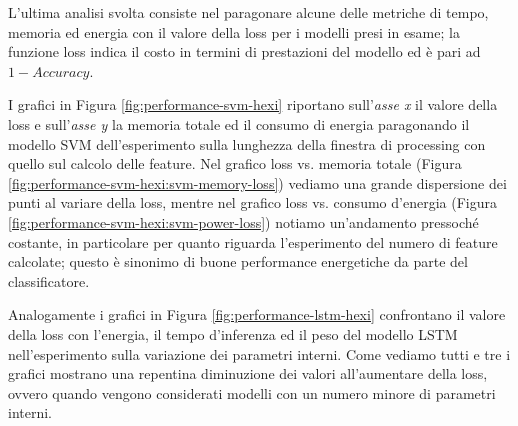 L'ultima analisi svolta consiste nel paragonare alcune delle metriche di tempo, memoria ed energia con il valore della loss per i modelli presi in esame; la funzione loss indica il costo in termini di prestazioni del modello ed è pari ad $1 - Accuracy$.

I grafici in Figura \ref{fig:performance-svm-hexi} riportano sull'\textit{asse x} il valore della loss e sull'\textit{asse y} la memoria totale ed il consumo di energia paragonando il modello SVM dell'esperimento sulla lunghezza della finestra di processing con quello sul calcolo delle feature. 
Nel grafico loss vs. memoria totale (Figura \ref{fig:performance-svm-hexi:svm-memory-loss}) vediamo una grande dispersione dei punti al variare della loss, mentre nel grafico loss vs. consumo d'energia (Figura \ref{fig:performance-svm-hexi:svm-power-loss}) notiamo un'andamento pressoché costante, in particolare per quanto riguarda l'esperimento del numero di feature calcolate; questo è sinonimo di buone performance energetiche da parte del classificatore.

Analogamente i grafici in Figura \ref{fig:performance-lstm-hexi} confrontano il valore della loss con l'energia, il tempo d'inferenza ed il peso del modello LSTM nell'esperimento sulla variazione dei parametri interni. Come vediamo tutti e tre i grafici mostrano una repentina diminuzione dei valori all'aumentare della loss, ovvero quando vengono considerati modelli con un numero minore di parametri interni.

